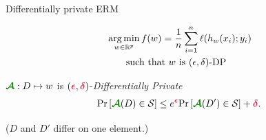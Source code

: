 \documentclass{beamer}
\begin{document}
\begin{frame}
  \vspace{2em}

  {\Huge
    \begin{center}
      Differentially private ERM
    \end{center}
  }
  \vspace{-1.5em}
  \begin{align*}
    & \operatorname*{arg\,min}_{w \in \mathbb R^p} f(w) = \frac 1n \sum_{i=1}^n \ell(h_w(x_i); y_i) \\
    & \qquad \text{such that $w$ is $(\epsilon, \delta)$-DP}
  \end{align*}

  \vspace{-1em}

\end{frame}

\begin{frame}
  \vspace{2em}

  $\emphcolb{\cA} : D \mapsto w$ is
  $(\emphcol{\epsilon}, \emphcol{\delta})$-\emph{Differentially
    Private}
  \begin{align*}
    \prob{\emphcolb{\cA}(D) \in \cS} \le e^{\emphcol{\epsilon}} \prob{\emphcolb{\cA}(D') \in \cS} + \emphcol{\delta}.
  \end{align*}

  \vspace{1em}

  \begin{flushright}
    ($D$ and $D'$ differ on one element.)
  \end{flushright}

\end{frame}
\end{document}
